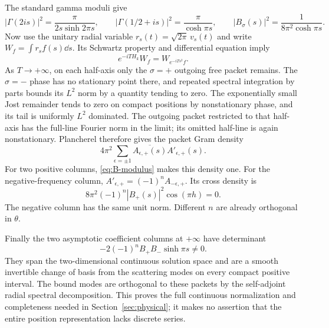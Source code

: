 The standard gamma moduli give
\begin{equation}
 |\Gamma(2is)|^2=\frac{\pi}{2s\sinh2\pi s},\qquad
 |\Gamma(1/2+is)|^2=\frac{\pi}{\cosh\pi s},\qquad
 |B_\sigma(s)|^2=\frac{1}{8\pi^2\cosh\pi s}.
 \label{eq:B-modulus}
\end{equation}
Now use the unitary radial variable $r_s(t)=\sqrt{2\pi}\,v_s(t)$ and
write $W_f=\int r_s f(s)\dd s$. Its Schwartz property and differential
equation imply
\begin{equation}
 e^{-iTH_k}W_f=W_{e^{-iTs^2}f}.
\end{equation}
As $T\to+\infty$, on each half-axis only the $\sigma=+$ outgoing
free packet remains. The $\sigma=-$ phase has no stationary point there,
and repeated spectral integration by parts bounds its $L^2$ norm by a
quantity tending to zero. The exponentially small Jost remainder tends
to zero on compact positions by nonstationary phase, and its tail is
uniformly $L^2$ dominated. The outgoing packet restricted to that half-axis
has the full-line Fourier norm in the limit; its omitted half-line is
again nonstationary. Plancherel therefore gives the packet Gram density
\begin{equation}
 4\pi^2\sum_{\epsilon=\pm1}
       \overline{A_{\epsilon,+}(s)}A'_{\epsilon,+}(s).
 \label{eq:packet-gram}
\end{equation}
For two positive columns, \eqref{eq:B-modulus} makes this density one.
For the negative-frequency column,
$A'_{\epsilon,+}=(-1)^nA_{-\epsilon,+}$. Its cross density is
\begin{equation}
 8\pi^2(-1)^n|B_+(s)|^2\cos(\pi h)=0.
\end{equation}
The negative column has the same unit norm. Different $n$ are already
orthogonal in $\theta$.

Finally the two asymptotic coefficient columns at $+\infty$ have determinant
\[
 -2(-1)^nB_+B_-\sinh\pi s\ne0.
\]
They span the two-dimensional
continuous solution space and are a smooth invertible change of basis
from the scattering modes on every compact positive interval. The bound
modes are orthogonal to these packets by the self-adjoint radial spectral
decomposition. This proves the full continuous normalization and
completeness needed in Section~\ref{sec:physical}; it makes no assertion
that the entire position representation lacks discrete series.
